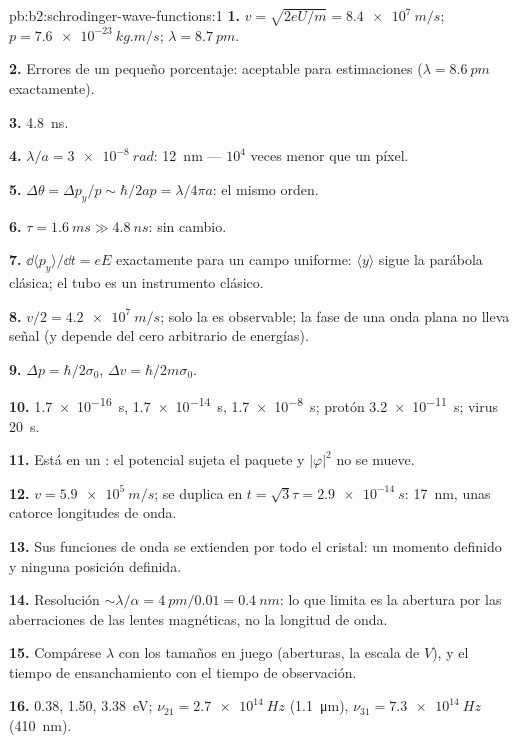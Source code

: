 \begin{solution}{pb:b2:schrodinger-wave-functions:1}
\textbf{1.} $v = \sqrt{2eU/m} = \qty{8.4e7}{m/s}$; $p = \qty{7.6e-23}{kg.m/s}$; $\lambda =
\qty{8.7}{pm}$.

\textbf{2.} Errores de un pequeño porcentaje: aceptable para estimaciones ($\lambda =
\qty{8.6}{pm}$ exactamente).

\textbf{3.} \qty{4.8}{ns}.

\textbf{4.} $\lambda/a = \qty{3e-8}{rad}$: \qty{12}{nm} --- $10^4$ veces menor que un
píxel.

\textbf{5.} $\Delta\theta = \Delta p_y/p \sim \hbar/2ap = \lambda/4\pi a$: el mismo orden.

\textbf{6.} $\tau = \qty{1.6}{ms} \gg \qty{4.8}{ns}$: sin cambio.

\textbf{7.} $\dd\langle p_y\rangle/\dd t = eE$ exactamente para un campo uniforme:
$\langle y\rangle$ sigue la parábola clásica; el tubo es un
instrumento clásico.

\textbf{8.} $v/2 = \qty{4.2e7}{m/s}$; solo la  es observable;
la fase de una onda plana no lleva señal (y depende del cero arbitrario
de energías).

\textbf{9.} $\Delta p = \hbar/2\sigma_0$, $\Delta v = \hbar/2m\sigma_0$.

\textbf{10.} \qty{1.7e-16}{s}, \qty{1.7e-14}{s}, \qty{1.7e-8}{s}; protón \qty{3.2e-11}{s};
virus \qty{20}{s}.

\textbf{11.} Está en un : el potencial sujeta el
paquete y $|\varphi|^2$ no se mueve.

\textbf{12.} $v = \qty{5.9e5}{m/s}$; se duplica en $t = \sqrt3\tau = \qty{2.9e-14}{s}$:
\qty{17}{nm}, unas catorce longitudes de onda.

\textbf{13.} Sus funciones de onda se extienden por todo el cristal: un
momento definido y ninguna posición definida.

\textbf{14.} Resolución $\sim\lambda/\alpha = \qty{4}{pm}/0.01 = \qty{0.4}{nm}$: lo que
limita es la abertura por las aberraciones de las lentes magnéticas, no la longitud de onda.

\textbf{15.} Compárese $\lambda$ con los tamaños en juego (aberturas, la
escala de $V$), y el tiempo de ensanchamiento con el tiempo de observación.

\textbf{16.} \qty{0.38}{}, \qty{1.50}{}, \qty{3.38}{eV}; $\nu_{21} = \qty{2.7e14}{Hz}$
(\qty{1.1}{\micro m}), $\nu_{31} = \qty{7.3e14}{Hz}$ (\qty{410}{nm}).


\end{solution}
